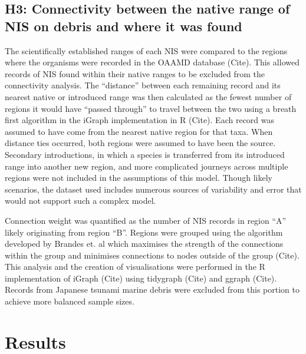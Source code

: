 \documentclass[a4paper, nobind]{templates/ociamthesis}
\begin{document}
\hypertarget{h3-connectivity-between-the-native-range-of-nis-on-debris-and-where-it-was-found}{%
\subsection{H3: Connectivity between the native range of NIS on debris and where it was found}\label{h3-connectivity-between-the-native-range-of-nis-on-debris-and-where-it-was-found}}

The scientifically established ranges of each NIS were compared to the regions where the organisms were recorded in the OAAMD database (Cite). This allowed records of NIS found within their native ranges to be excluded from the connectivity analysis. The ``distance'' between each remaining record and its nearest native or introduced range was then calculated as the fewest number of regions it would have ``passed through'' to travel between the two using a breath first algorithm in the iGraph implementation in R (Cite). Each record was assumed to have come from the nearest native region for that taxa. When distance ties occurred, both regions were assumed to have been the source. Secondary introductions, in which a species is transferred from its introduced range into another new region, and more complicated journeys across multiple regions were not included in the assumptions of this model. Though likely scenarios, the dataset used includes numerous sources of variability and error that would not support such a complex model.

Connection weight was quantified as the number of NIS records in region ``A'' likely originating from region ``B''. Regions were grouped using the algorithm developed by Brandes et. al which maximises the strength of the connections within the group and minimises connections to nodes outside of the group (Cite). This analysis and the creation of visualisations were performed in the R implementation of iGraph (Cite) using tidygraph (Cite) and ggraph (Cite). Records from Japanese tsunami marine debris were excluded from this portion to achieve more balanced sample sizes.

\hypertarget{results-1}{%
\section{Results}\label{results-1}}
\end{document}

